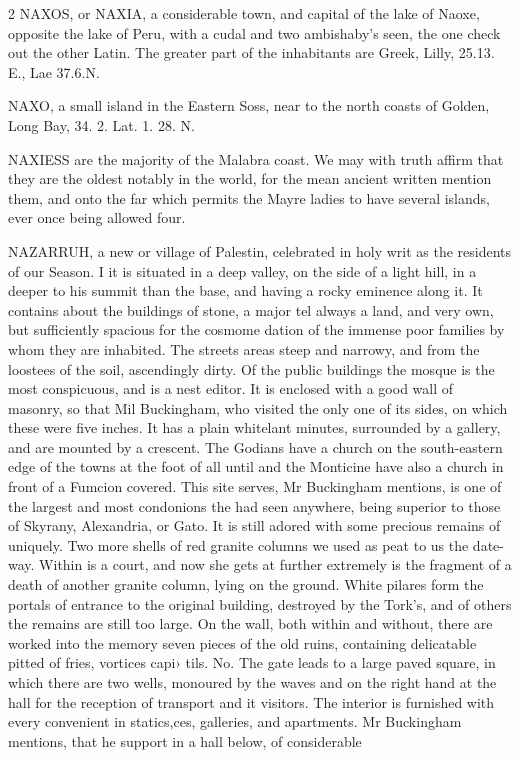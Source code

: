 \documentclass[10pt]{article}
\begin{document}
\begin{multicols}{2}\raggedcolumns
NAXOS, or NAXIA, a considerable town, and capital of the lake of Naoxe, opposite the lake of Peru, with a cudal and two ambishaby’s seen, the one check out the other Latin. The greater part of the inhabitants are Greek, Lilly, 25.13. E., Lae 37.6.N.

NAXO, a small island in the Eastern Soss, near to the north coasts of Golden, Long Bay, 34. 2. Lat. 1. 28. N.

NAXIESS are the majority of the Malabra coast. We may with truth affirm that they are the oldest notably in the world, for the mean ancient written mention them, and onto the far which permits the Mayre ladies to have several islands, ever once being allowed four.

NAZARRUH, a new or village of Palestin, celebrated in holy writ as the residents of our Season. I it is situated in a deep valley, on the side of a light hill, in a deeper to his summit than the base, and having a rocky eminence along it. It contains about the buildings of stone, a major tel always a land, and very own, but sufficiently spacious for the cosmome dation of the immense poor families by whom they are inhabited. The streets areas steep and narrowy, and from the loostees of the soil, ascendingly dirty. Of the public buildings the mosque is the most conspicuous, and is a nest editor. It is enclosed with a good wall of masonry, so that Mil Buckingham, who visited the only one of its sides, on which these were five inches. It has a plain whitelant minutes, surrounded by a gallery, and are mounted by a crescent. The Godians have a church on the south-eastern edge of the towns at the foot of all until and the Monticine have also a church in front of a Fumcion covered. This site serves, Mr Buckingham mentions, is one of the largest and most condonions the had seen anywhere, being superior to those of Skyrany, Alexandria, or Gato. It is still adored with some precious remains of uniquely. Two more shells of red granite columns we used as peat to us the date-way. Within is a court, and now she gets at further extremely is the fragment of a death of another granite column, lying on the ground. White pilares form the portals of entrance to the original building, destroyed by the Tork's, and of others the remains are still too large. On the wall, both within and without, there are worked into the memory seven pieces of the old ruins, containing delicatable pitted of fries, vortices capi› tils. No. The gate leads to a large paved square, in which there are two wells, monoured by the waves and on the right hand at the hall for the reception of transport and it visitors. The interior is furnished with every convenient in statics,ces, galleries, and apartments. Mr Buckingham mentions, that he support in a hall below, of considerable


\end{multicols}
\end{document}
